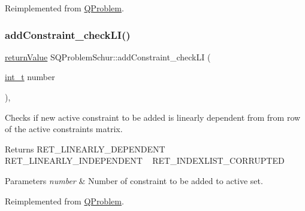 Reimplemented from \hyperlink{class_q_problem_afa750995f0d344547e59cb91b3446abb}{Q\+Problem}.

\mbox{\label{class_s_q_problem_schur_a0dd498ae9d7684d3d9fc9ed83d161c1e}} 
\subsubsection{\texorpdfstring{add\+Constraint\+\_\+check\+L\+I()}{addConstraint\_checkLI()}}
{\footnotesize\ttfamily \hyperlink{_message_handling_8hpp_a81d556f613bfbabd0b1f9488c0fa865e}{return\+Value} S\+Q\+Problem\+Schur\+::add\+Constraint\+\_\+check\+LI (\begin{DoxyParamCaption}\item[{\hyperlink{_types_8hpp_ab6fd6105e64ed14a0c9281326f05e623}{int\+\_\+t}}]{number }\end{DoxyParamCaption})\hspace{0.3cm}{\ttfamily [protected]}, {\ttfamily [virtual]}}

Checks if new active constraint to be added is linearly dependent from from row of the active constraints matrix. \begin{DoxyReturn}{Returns}
R\+E\+T\+\_\+\+L\+I\+N\+E\+A\+R\+L\+Y\+\_\+\+D\+E\+P\+E\+N\+D\+E\+NT ~\newline
 R\+E\+T\+\_\+\+L\+I\+N\+E\+A\+R\+L\+Y\+\_\+\+I\+N\+D\+E\+P\+E\+N\+D\+E\+NT ~\newline
 R\+E\+T\+\_\+\+I\+N\+D\+E\+X\+L\+I\+S\+T\+\_\+\+C\+O\+R\+R\+U\+P\+T\+ED 
\end{DoxyReturn}

\begin{DoxyParams}{Parameters}
{\em number} & Number of constraint to be added to active set. \\
\hline
\end{DoxyParams}


Reimplemented from \hyperlink{class_q_problem_aa19d6942b7aa18dbdaf7646d125ecf05}{Q\+Problem}.

\mbox{\label{class_s_q_problem_schur_ae69dcb1b007613e4974d4a2cc6751334}} 
